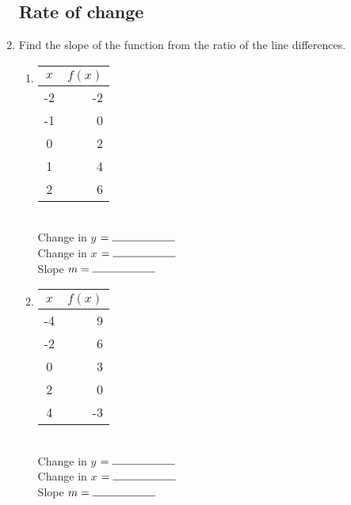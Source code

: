 \documentclass[12pt, twoside]{article}
\begin{document}
\begin{enumerate}
\subsection*{Rate of change}

\item Find the slope of the function from the ratio of the line differences.

  \begin{multicols}{2}
  \begin{enumerate}
    \item
      \begin{tabular}{|c|r|}
      \hline
      $x$ & $f(x)$\\
      \hline
      -2 & -2 \\
      \hline
      -1 & 0 \\
      \hline
      0 & 2 \\
      \hline
      1 & 4 \\
      \hline
      2 & 6 \\
      \hline
      \end{tabular}\\[0.85cm]

      Change in $y$ $= \rule{2cm}{0.15mm}$ \\[0.5cm]
      Change in $x$ $= \rule{2cm}{0.15mm}$ \\[0.5cm]
      Slope $m= \rule{2cm}{0.15mm}$\\

    \item
      \begin{tabular}{|c|r|}
      \hline
      $x$ & $f(x)$\\
      \hline
      -4 & 9 \\
      \hline
      -2 & 6 \\
      \hline
      0 & 3 \\
      \hline
      2 & 0 \\
      \hline
      4 & -3 \\
      \hline
      \end{tabular}\\[0.85cm]

      Change in $y$ $= \rule{2cm}{0.15mm}$ \\[0.5cm]
      Change in $x$ $= \rule{2cm}{0.15mm}$ \\[0.5cm]
      Slope $m= \rule{2cm}{0.15mm}$\\


    \end{enumerate}
    \end{multicols}


\end{enumerate}
\end{document}
